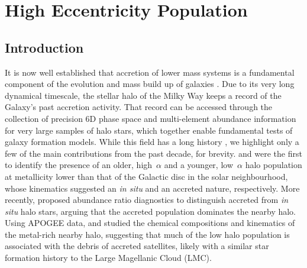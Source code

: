 \chapter{High Eccentricity Population}

\section{Introduction} \label{intro}


It is now well established that accretion of lower mass systems
is a fundamental component of the evolution and mass build up of
galaxies \citep{1991ApJ...379...52W}.  Due to its very long dynamical
timescale, the stellar halo of the Milky Way keeps a record of the
Galaxy's past accretion activity.  That record can be accessed
through the collection of precision 6D phase space and multi-element abundance
information for very large samples of halo stars, which together enable fundamental
tests of galaxy formation models.  While this field has a long history \citep[e.g.,][]{1962ApJ...136..748E,1978ApJ...225..357S},
we highlight only a few of the main contributions from the past
decade, for brevity.  \citet{2010A&A...511L..10N} and
\citet{2012A&A...538A..21S} were the first to identify the presence
of an older, high~$\alpha$ and a younger, low~$\alpha$ halo population at metallicity lower than that of the Galactic disc in the solar neighbourhood,
whose kinematics suggested an {\it in situ} and an accreted nature,
respectively.  More recently, \citet{2015MNRAS.453..758H} proposed
abundance ratio diagnostics to distinguish accreted from {\it in
situ} halo stars, arguing that the accreted population dominates
the nearby halo. Using APOGEE data, \citet{2018ApJ...852...50F} and
\citet{2018ApJ...852...49H} studied the chemical compositions and
kinematics of the metal-rich nearby halo, suggesting that much of
the low \mgfe{} halo population is associated with the debris of accreted satellites, likely with a similar star formation history to
the Large Magellanic Cloud (LMC).

